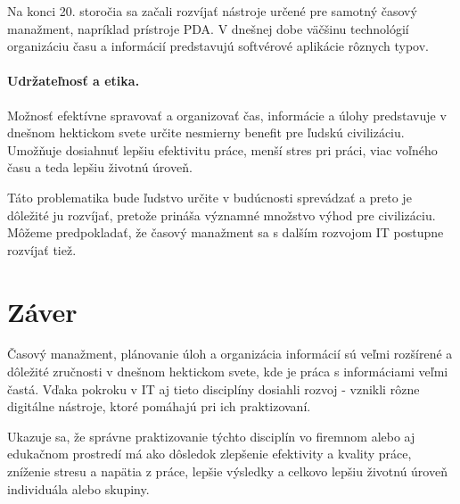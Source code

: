\documentclass[10pt,slovak,a4paper]{article}
\begin{document}
		Na konci 20. storočia sa začali rozvíjať nástroje určené pre samotný časový manažment, napríklad prístroje PDA. V dnešnej dobe väčšinu technológií organizáciu času a informácií predstavujú softvérové aplikácie rôznych typov. 
		
		\paragraph{Udržateľnosť a etika.\\}
		Možnosť efektívne spravovať a organizovať čas, informácie a úlohy predstavuje v dnešnom hektickom svete určite nesmierny benefit pre ľudskú civilizáciu. Umožňuje dosiahnuť lepšiu efektivitu práce, menší stres pri práci, viac voľného času a teda lepšiu životnú úroveň.
		
		Táto problematika bude ľudstvo určite v budúcnosti sprevádzať a preto je dôležité ju rozvíjať, pretože prináša významné množstvo výhod pre civilizáciu. Môžeme predpokladať, že časový manažment sa s dalším rozvojom IT postupne rozvíjať tiež.
		
\section{Záver}

		Časový manažment, plánovanie úloh a organizácia informácií sú veľmi rozšírené a dôležité zručnosti v dnešnom hektickom svete, kde je práca s informáciami veľmi častá. Vďaka pokroku v IT aj tieto disciplíny dosiahli rozvoj - vznikli rôzne digitálne nástroje, ktoré pomáhajú pri ich praktizovaní.
		
		Ukazuje sa, že správne praktizovanie týchto disciplín vo firemnom alebo aj edukačnom prostredí má ako dôsledok zlepšenie efektivity a kvality práce, zníženie stresu a napätia z práce, lepšie výsledky a celkovo lepšiu životnú úroveň individuála alebo skupiny.



\end{document}
